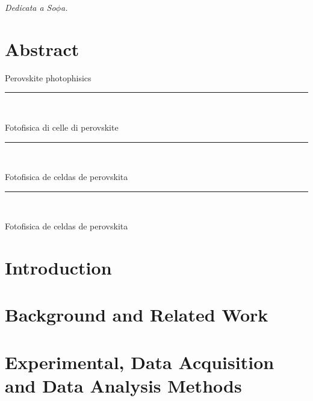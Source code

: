 \documentclass[b5paper, 12pt, openright]{book} %
\begin{document}
\cleardoublepage \vspace*{12cm}
\begin{flushright}
\large {\it Dedicata a So$\phi$a.}
\end{flushright}


\chapter[Abstract]{\centering Abstract}
\vfill
Perovskite photophisics

{
\vfill
\centering \rule{5cm}{1pt}\\
\vfill
}
\EnableQuotes
\noindent
Fotofisica di celle di perovskite

{
	\vfill
	\centering \rule{5cm}{1pt}\\
	\vfill
}
\EnableQuotes
\noindent

Fotofisica de celdas de perovskita

{
	\vfill
	\centering \rule{5cm}{1pt}\\
	\vfill
}
\noindent

Fotofisica de celdas de perovskita

\vfill

\EnableQuotes

\restoregeometry


\mainmatter
\pagestyle{headings}


\chapter{Introduction}
	\graphicspath{ {./contents_img/intro/} }
	

\chapter{Background and Related Work}
	\graphicspath{ {./contents_img/background/} }
	

\chapter{Experimental, Data Acquisition and Data Analysis Methods}
	\graphicspath{ {./contents_img/methods/} }
	
\end{document}
